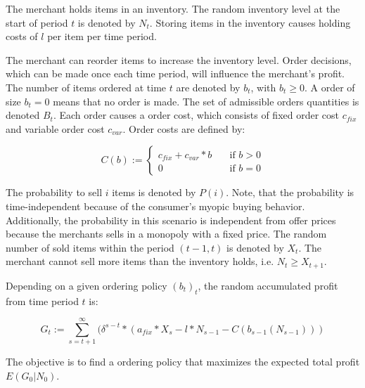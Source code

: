 The merchant holds items in an inventory.
The random inventory level at the start of period $t$ is denoted by $N_t$.
Storing items in the inventory causes holding costs of $l$ per item per time period. %

The merchant can reorder items to increase the inventory level.
Order decisions, which can be made once each time period, will influence the merchant's profit.
The number of items ordered at time $t$ are denoted by $b_t$, with $b_t \geq 0$.
A order of size $b_t = 0$ means that no order is made.
The set of admissible orders quantities is denoted $B_t$.
Each order causes a order cost, which consists of fixed order cost $c_{fix}$ and variable order cost $c_{var}$.
Order costs are defined by:

$$
C(b) := \begin{cases}
c_{fix} + c_{var} * b  & \quad \text{if } b > 0 \\
0  & \quad \text{if } b = 0
\end{cases}
$$

The probability to sell $i$ items is denoted by $P(i)$.
Note, that the probability is time-independent because of the consumer's myopic buying behavior.
Additionally, the probability in this scenario is independent from offer prices because the merchants sells in a monopoly with a fixed price.
The random number of sold items within the period $(t-1, t)$ is denoted by $X_t$.
The merchant cannot sell more items than the inventory holds, i.e. $N_t \geq X_{t+1}$.

Depending on a given ordering policy $(b_t)_t$, the random accumulated profit from time period $t$ is:

$$
G_t := \sum_{s=t+1}^{\infty} (\delta^{s-t} * (a_{fix} * X_s - l * N_{s-1} - C(b_{s-1}(N_{s-1})))
$$

The objective is to find a ordering policy that maximizes the expected total profit $E(G_0 | N_0)$.


